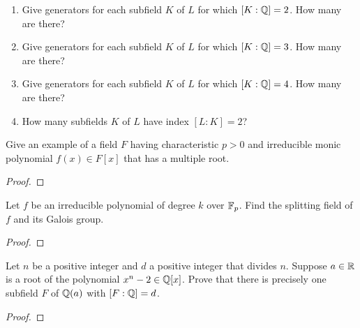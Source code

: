 \begin{problem}
\begin{enumerate}[label=(\alph*)]
\item Give generators for each subfield $K$ of $L$ for which
  $[K:\mathbb{Q}]=2$. How many are there?
\item Give generators for each subfield $K$ of $L$ for which
  $[K:\mathbb{Q}]=3$. How many are there?
\item Give generators for each subfield $K$ of $L$ for which
  $[K:\mathbb{Q}]=4$. How many are there?
\item How many subfields $K$ of $L$ have index $[L:K]=2$?
\end{enumerate}
\end{problem}

\begin{problem}
Give an example of a field $F$ having characteristic $p>0$ and irreducible
monic polynomial $f(x)\in F[x]$ that has a multiple root.
\begin{proof}

\end{proof}
\end{problem}

\begin{problem}
Let $f$ be an irreducible polynomial of degree $k$ over $\mathbb{F}_p$. Find the
splitting field of $f$ and its Galois group.
\end{problem}
\begin{proof}
\end{proof}

\begin{problem}
Let $n$ be a positive integer and $d$ a positive integer that divides
$n$. Suppose $a\in\mathbb{R}$ is a root of the polynomial
$x^n-2\in\mathbb{Q}[x]$. Prove that there is precisely one subfield $F$ of
$\mathbb{Q}(a)$ with $[F:\mathbb{Q}]=d$.
\end{problem}
\begin{proof}
\end{proof}

